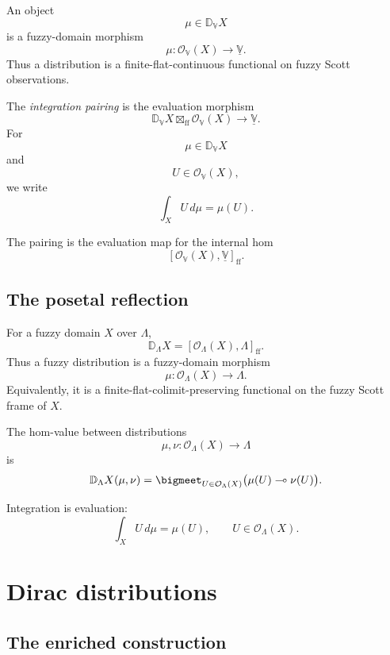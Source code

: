 An object
\[
    \mu\in\mathbb D_{\mathbb V}X
\]
is a fuzzy-domain morphism
\[
    \mu:\mathcal O_{\mathbb V}(X)\to\underline{\mathbb V}.
\]
Thus a distribution is a finite-flat-continuous functional on fuzzy Scott
observations.

\begin{definition}
\label{def:fuzzy-integration-pairing}
The \emph{integration pairing} is the evaluation morphism
\[
    \mathbb D_{\mathbb V}X
    \boxtimes_{\mathrm{ff}}
    \mathcal O_{\mathbb V}(X)
    \longrightarrow
    \underline{\mathbb V}.
\]
For
\[
    \mu\in\mathbb D_{\mathbb V}X
\]
and
\[
    U\in\mathcal O_{\mathbb V}(X),
\]
we write
\[
    \int_X U\,d\mu
    =
    \mu(U).
\]
\end{definition}

The pairing is the evaluation map for the internal hom
\[
    [\mathcal O_{\mathbb V}(X),\underline{\mathbb V}]_{\mathrm{ff}}.
\]

\subsection{The posetal reflection}
\label{subsec:fuzzy-distributions-posetal}

For a fuzzy domain \(X\) over \(\Lambda\),
\[
    \mathbb D_{\Lambda}X
    =
    [\mathcal O_{\Lambda}(X),\Lambda]_{\mathrm{ff}}.
\]
Thus a fuzzy distribution is a fuzzy-domain morphism
\[
    \mu:\mathcal O_{\Lambda}(X)\to\Lambda.
\]
Equivalently, it is a finite-flat-colimit-preserving functional on the fuzzy
Scott frame of \(X\).

The hom-value between distributions
\[
    \mu,\nu:\mathcal O_{\Lambda}(X)\to\Lambda
\]
is
\[
    \mathbb D_{\Lambda}X(\mu,\nu)
    =
    \bigmeet_{U\in\mathcal O_{\Lambda}(X)}
    \bigl(\mu(U)\multimap\nu(U)\bigr).
\]

Integration is evaluation:
\[
    \int_X U\,d\mu
    =
    \mu(U),
    \qquad
    U\in\mathcal O_{\Lambda}(X).
\]

\section{Dirac distributions}
\label{sec:dirac-distributions-fuzzy-domain}

\subsection{The enriched construction}
\label{subsec:dirac-enriched}

